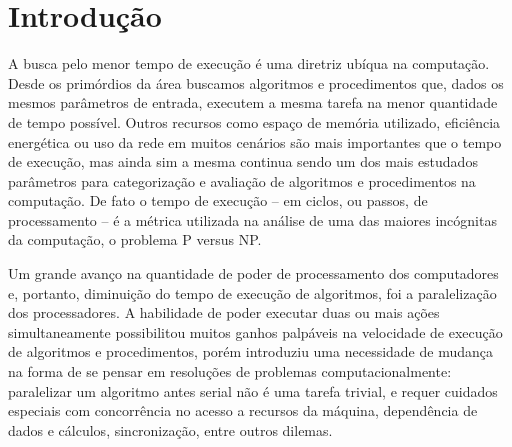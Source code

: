 \documentclass[12pt, %
openright, 
oneside, %
a4paper,    %
brazil]{facom-ufu-abntex2}
\begin{document}

\tableofcontents*
\cleardoublepage



\textual


\chapter{Introdução}

A busca pelo menor tempo de execução é uma diretriz ubíqua na computação. Desde os primórdios da área buscamos algoritmos e procedimentos que, dados os mesmos parâmetros de entrada, executem a mesma tarefa na menor quantidade de tempo possível. Outros recursos como espaço de memória utilizado, eficiência energética ou uso da rede em muitos cenários são mais importantes que o tempo de execução, mas ainda sim a mesma continua sendo um dos mais estudados parâmetros para categorização e avaliação de algoritmos e procedimentos na computação. De fato o tempo de execução -- em ciclos, ou passos, de processamento -- é a métrica utilizada na análise de uma das maiores incógnitas da computação, o problema P versus NP.

Um grande avanço na quantidade de poder de processamento dos computadores e, portanto, diminuição do tempo de execução de algoritmos, foi a paralelização dos processadores. A habilidade de poder executar duas ou mais ações simultaneamente possibilitou muitos ganhos palpáveis na velocidade de execução de algoritmos e procedimentos, porém introduziu uma necessidade de mudança na forma de se pensar em resoluções de problemas computacionalmente: paralelizar um algoritmo antes serial não é uma tarefa trivial, e requer cuidados especiais com concorrência no acesso a recursos da máquina, dependência de dados e cálculos, sincronização, entre outros dilemas.
\end{document}
